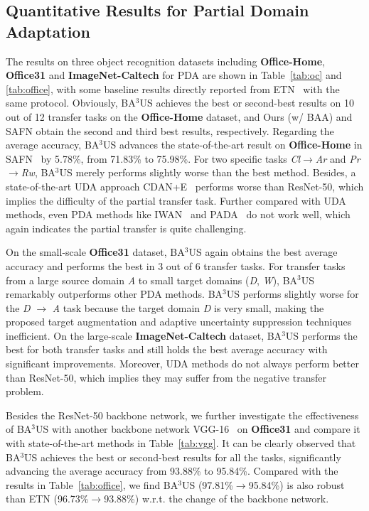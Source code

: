 \documentclass[runningheads]{llncs}
\begin{document}
\subsection{Quantitative Results for Partial Domain Adaptation}
The results on three object recognition datasets including \textbf{Office-Home}, \textbf{Office31} and \textbf{ImageNet-Caltech} for PDA are shown in Table~\ref{tab:oc} and \ref{tab:office}, with some baseline results directly reported from ETN~\cite{cao2019learning} with the same protocol.
Obviously, BA$^3$US achieves the best or second-best results on 10 out of 12 transfer tasks on the \textbf{Office-Home} dataset, and Ours (w/ BAA) and SAFN obtain the second and third best results, respectively.
Regarding the average accuracy, BA$^3$US advances the state-of-the-art result on \textbf{Office-Home} in SAFN~\cite{xu2019unsupervised} by 5.78\%, from 71.83\% to 75.98\%.
For two specific tasks \emph{Cl}$\to$\emph{Ar} and \emph{Pr}$\to$\emph{Rw}, BA$^3$US merely performs slightly worse than the best method.
Besides, a state-of-the-art UDA approach CDAN+E~\cite{long2018conditional} performs worse than ResNet-50, which implies the difficulty of the partial transfer task.
Further compared with UDA methods, even PDA methods like IWAN~\cite{zhang2018importance} and PADA~\cite{cao2018partial} do not work well, which again indicates the partial transfer is quite challenging.


On the small-scale \textbf{Office31} dataset, BA$^3$US again obtains the best average accuracy and performs the best in 3 out of 6 transfer tasks. 
For transfer tasks from a large source domain \emph{A} to small target domains (\emph{D}, \emph{W}), BA$^3$US remarkably outperforms other PDA methods.
BA$^3$US performs slightly worse for the \emph{D} $\to$ \emph{A} task because the target domain \emph{D} is very small, making the proposed target augmentation and adaptive uncertainty suppression techniques inefficient. 
On the large-scale \textbf{ImageNet-Caltech} dataset, BA$^3$US performs the best for both transfer tasks and still holds the best average accuracy with significant improvements.
Moreover, UDA methods do not always perform better than ResNet-50, which implies they may suffer from the negative transfer problem. 
	
	
Besides the ResNet-50 backbone network, we further investigate the effectiveness of BA$^3$US with another backbone network VGG-16~\cite{simonyan2014very} on \textbf{Office31} and compare it with state-of-the-art methods in Table~\ref{tab:vgg}.
It can be clearly observed that BA$^3$US achieves the best or second-best results for all the tasks, significantly advancing the average accuracy from 93.88\% to 95.84\%.
Compared with the results in Table~\ref{tab:office}, we find BA$^3$US (97.81\%$\to$95.84\%) is also robust than ETN (96.73\%$\to$93.88\%) w.r.t. the change of the backbone network.
\end{document}
